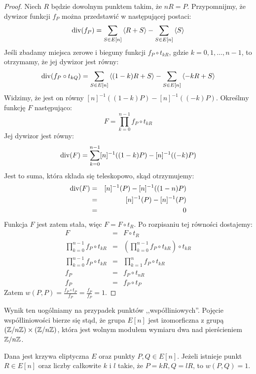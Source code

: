 \begin{proof}
Niech $R$ będzie dowolnym punktem takim, że $nR = P$.
Przypomnijmy, że dywizor funkcji $f_P$
można przedstawić w następującej postaci:
\begin{equation*}
\operatorname{div}(f_P) = \sum_{S \in E[n]} \left\langle R + S\right\rangle - \sum_{S \in E[n]} \left\langle S\right\rangle
\end{equation*}
Jeśli zbadamy miejsca zerowe i bieguny funkcji $f_P \circ t_{kR}$,
gdzie $k = 0, 1, \ldots, n-1$,
to otrzymamy, że jej dywizor jest równy:
\begin{equation*}
\operatorname{div}(f_P \circ t_{kQ}) =
\sum_{S \in E[n]} \left\langle(1-k)R + S\right\rangle - \sum_{S \in E[n]} \left\langle-kR + S\right\rangle
\end{equation*}
Widzimy, że jest on równy $[n]^{-1}((1-k)P) - [n]^{-1}((-k)P)$.
Określmy funkcję $F$ następująco:
\begin{equation*}
F = \prod_{k=0}^{n-1} f_P \circ t_{kR}
\end{equation*}
Jej dywizor jest równy:
\begin{equation*}
\operatorname{div}(F) = \sum_{k=0}^{n-1} [n]^{-1}((1-k)P) - [n]^{-1}((-k)P)
\end{equation*}
Jest to suma, która składa się teleskopowo, skąd otrzymujemy:
\begin{eqnarray*}
\operatorname{div}(F)
& = & [n]^{-1}(P) - [n]^{-1}((1-n)P) \\
& = & [n]^{-1}(P) - [n]^{-1}(P) \\
& = & 0
\end{eqnarray*}
Funkcja $F$ jest zatem stała, więc $F = F \circ t_R$.
Po rozpisaniu tej równości dostajemy:
\begin{eqnarray*}
F
& = &
F \circ t_R
\\
\prod_{k=0}^{n-1} f_P \circ t_{kR}
& = &
(\prod_{k=0}^{n-1} f_P \circ t_{kR}) \circ t_{kR}
\\
\prod_{k=0}^{n-1} f_P \circ t_{kR}
& = &
\prod_{k=1}^{n} f_P \circ t_{kR}
\\
f_P
& = &
f_P \circ t_{nR}
\\
f_P
& = &
f_P \circ t_P
\end{eqnarray*}
Zatem $w(P,P) = \frac{f_P \circ t_P}{f_P} = \frac{f_P}{f_P} = 1$.
\end{proof}

Wynik ten uogólniamy na przypadek punktów ,,współliniowych''.
Pojęcie współliniowości bierze się stąd,
że grupa $E[n]$ jest izomorficzna z grupą $(\mathbb{Z}/n\mathbb{Z})\times(\mathbb{Z}/n\mathbb{Z})$,
która jest wolnym modułem wymiaru dwa nad pierścieniem $\mathbb{Z}/n\mathbb{Z}$.

\begin{theorem}
Dana jest krzywa eliptyczna $E$ oraz punkty $P, Q \in E[n]$.
Jeżeli istnieje punkt $R \in E[n]$ oraz liczby całkowite $k$ i $l$
takie, że $P = kR, Q = lR$, to $w(P, Q) = 1$.
\end{theorem}

